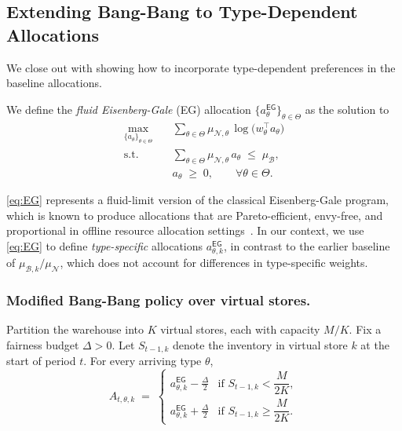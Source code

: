 \documentclass[mnsc,nonblindrev]{informs3}
\newcommand{\BDist}{\mathcal{B}}
\newcommand{\Bmean}{\mu_{\BDist}}
\newcommand{\ALG}{{Bang-Bang}\xspace}
\newcommand{\EG}{\textsf{EG}}
\renewcommand{\paragraph}[1]{\subsubsection*{#1}}
\begin{document}
\begin{APPENDICES}
\subsection{Extending \ALG to Type-Dependent Allocations}\label{apx:extensions-improvement}

We close out with showing how to incorporate type-dependent preferences in the baseline allocations. 

We define the {\em fluid Eisenberg-Gale} (EG) allocation  $\{a_\theta^{\EG}\}_{\theta\in\Theta}$ as the solution to
\begin{equation}
\label{eq:EG}
\begin{aligned}
\max_{\{a_\theta\}_{\theta\in\Theta}} \quad & \sum_{\theta\in\Theta} \mu_{\mathcal{N}, \theta} \,\log\bigl(w_\theta^\top a_\theta\bigr) \\
\text{s.t.} \quad & \sum_{\theta\in\Theta}\mu_{\mathcal{N},\theta}\, a_\theta \;\le\; \Bmean, \\
& a_\theta \;\ge\; 0,\qquad \forall \theta\in\Theta.
\end{aligned}
\end{equation}

\cref{eq:EG} represents a fluid-limit version of the classical Eisenberg-Gale program, which is known to produce allocations that are Pareto-efficient, envy-free, and proportional in offline resource allocation settings~\citep{eisenberg1961aggregation,varian1973equity,jain2010eisenberg}. In our context, we use \cref{eq:EG} to define {\em type-specific} allocations $a_{\theta,k}^{\EG}$, in contrast to the earlier baseline of $\mu_{\mathcal{B},k} / \mu_{\mathcal{N}}$, which does not account for differences in type-specific weights.

\paragraph{Modified Bang-Bang policy over virtual stores.}
Partition the warehouse into $K$ virtual stores, each with capacity $M/K$. Fix a fairness budget $\Delta>0$.
Let $S_{t-1,k}$ denote the inventory in virtual store $k$ at the start of period $t$. For every arriving type $\theta$,
\begin{equation}
\label{eq:bb-eg}
A_{t,\theta,k} \;=\;
\begin{cases}
a_{\theta,k}^{\EG} - \frac{\Delta}{2} & \text{if } S_{t-1,k} < \dfrac{M}{2K},\\[2mm]
a_{\theta,k}^{\EG} + \frac{\Delta}{2} & \text{if } S_{t-1,k} \ge \dfrac{M}{2K}.
\end{cases}
\end{equation}


\end{APPENDICES}
\end{document}
